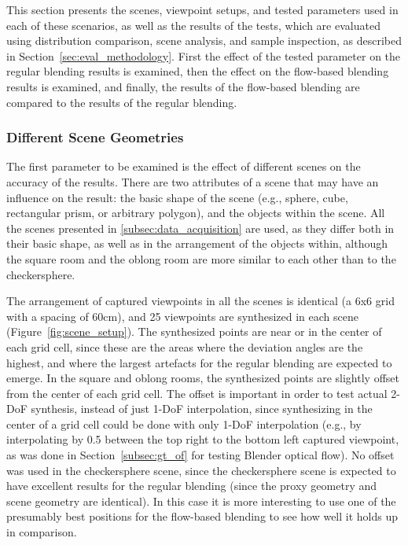 This section presents the scenes, viewpoint setups, and tested parameters used in each of these scenarios, as well as the results of the tests, which are evaluated using distribution comparison, scene analysis, and sample inspection, as described in Section~\ref{sec:eval_methodology}. First the effect of the tested parameter on the regular blending results is examined, then the effect on the flow-based blending results is examined, and finally, the results of the flow-based blending are compared to the results of the regular blending.

\subsubsection{Different Scene Geometries}
The first parameter to be examined is the effect of different scenes on the accuracy of the results. There are two attributes of a scene that may have an influence on the result: the basic shape of the scene (e.g., sphere, cube, rectangular prism, or arbitrary polygon), and the objects within the scene. All the scenes presented in \ref{subsec:data_acquisition} are used, as they differ both in their basic shape, as well as in the arrangement of the objects within, although the square room and the oblong room are more similar to each other than to the checkersphere.

The arrangement of captured viewpoints in all the scenes is identical (a 6x6 grid with a spacing of 60cm), and 25 viewpoints are synthesized in each scene (Figure~\ref{fig:scene_setup}). The synthesized points are near or in the center of each grid cell, since these are the areas where the deviation angles are the highest, and where the largest artefacts for the regular blending are expected to emerge. In the square and oblong rooms, the synthesized points are slightly offset from the center of each grid cell.
The offset is important in order to test actual 2-DoF synthesis, instead of just 1-DoF interpolation, since synthesizing in the center of a grid cell could be done with only 1-DoF interpolation (e.g., by interpolating by 0.5 between the top right to the bottom left captured viewpoint, as was done in Section~\ref{subsec:gt_of} for testing Blender optical flow). No offset was used in the checkersphere scene, since the checkersphere scene is expected to have excellent results for the regular blending (since the proxy geometry and scene geometry are identical). In this case it is more interesting to use one of the presumably best positions for the flow-based blending to see how well it holds up in comparison.

